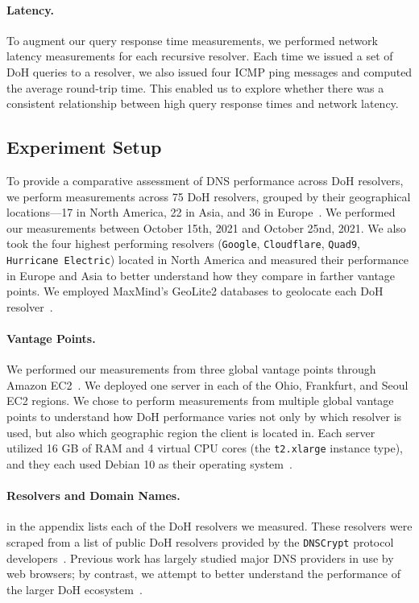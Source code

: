 \paragraph{Latency.}
To augment our query response time measurements, we performed network latency measurements for each recursive resolver.
Each time we issued a set of DoH queries to a resolver, we also issued four ICMP ping messages and computed the average round-trip time.
This enabled us to explore whether there was a consistent relationship between high query response times and network latency.

\subsection{Experiment Setup}
To provide a comparative assessment of DNS performance across DoH resolvers, we perform measurements across 75 DoH resolvers, grouped by their geographical locations—17 in North America, 22 in Asia, and 36 in Europe~\cite{dnscrypt}.
We performed our measurements between October 15th, 2021 and October 25nd, 2021.
We also took the four highest performing resolvers (\texttt{Google}, \texttt{Cloudflare}, \texttt{Quad9}, \texttt{Hurricane Electric}) located in North America and measured their performance in Europe and Asia to better understand how they compare in farther vantage points.  
We employed MaxMind's GeoLite2 databases to geolocate each DoH resolver~\cite{maxmind}.

\paragraph{Vantage Points.}
We performed our measurements from three global vantage points through Amazon EC2~\cite{amazon_ec2}.
We deployed one server in each of the Ohio, Frankfurt, and Seoul EC2 regions.
We chose to perform measurements from multiple global vantage points to understand how DoH performance varies not only by which resolver is used, but also which geographic region the client is located in.
Each server utilized 16 GB of RAM and 4 virtual CPU cores (the \texttt{t2.xlarge} instance type), and they each used Debian 10 as their operating system~\cite{amazon_ec2_instance_types}.

\paragraph{Resolvers and Domain Names.}
 in the appendix lists each of the DoH resolvers we measured.
These resolvers were scraped from a list of public DoH resolvers provided by the \texttt{DNSCrypt} protocol developers~\cite{dnscrypt}.
Previous work has largely studied major DNS providers in use by web browsers; by contrast, we attempt to better understand the performance of the larger DoH ecosystem~\cite{hounsel2020comparing,borgolte2019dns}.

